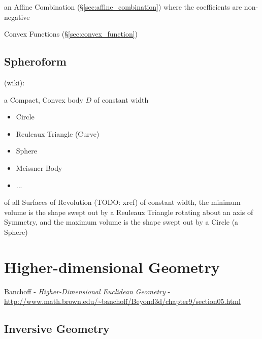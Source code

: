 an Affine Combination (\S\ref{sec:affine_combination}) where the coefficients
are non-negative

\fist Convex Functions (\S\ref{sec:convex_function})



\subsection{Spheroform}\label{sec:spheroform}

(wiki):

a Compact, Convex body $D$ of constant width

\begin{itemize}
  \item Circle
  \item Reuleaux Triangle (Curve)
  \item Sphere
  \item Meissner Body
  \item ...
\end{itemize}

of all Surfaces of Revolution (TODO: xref) of constant width, the minimum volume
is the shape swept out by a Reuleaux Triangle rotating about an axis of
Symmetry, and the maximum volume is the shape swept out by a Circle (a Sphere)



\section{Higher-dimensional Geometry}\label{sec:higher_geometry}

Banchoff - \emph{Higher-Dimensional Euclidean Geometry} -
\url{http://www.math.brown.edu/~banchoff/Beyond3d/chapter9/section05.html}



\subsection{Inversive Geometry}\label{sec:inversive_geometry}


